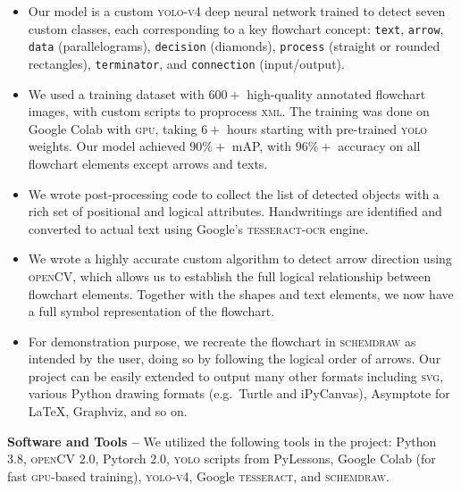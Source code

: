 \documentclass[10pt]{article}
\begin{document}
\begin{itemize}

\item Our model is a custom \textsc{yolo-v4} deep neural network
trained to detect seven custom classes, each corresponding to
a key flowchart concept: \texttt{text}, \texttt{arrow},
\texttt{data} (parallelograms), \texttt{decision} (diamonds), \texttt{process} (straight
or rounded rectangles), \texttt{terminator}, and \texttt{connection} (input/output).

\item We used a training dataset with $600+$ high-quality annotated flowchart
images, with custom scripts to proprocess \textsc{xml}.
The training was done on Google Colab with \textsc{gpu}, taking $6+$ hours
starting with pre-trained \textsc{yolo} weights.
Our model achieved $90\%+$ mAP, with $96\%+$ accuracy on
all flowchart elements except arrows and texts.

\item We wrote post-processing code to collect the list of detected objects with a
rich set of positional and logical attributes.
Handwritings are identified and converted to actual text using
Google's \textsc{tesseract-ocr} engine.

\item We wrote a highly accurate custom algorithm to detect arrow direction
using \textsc{openCV}, which allows us to establish the full logical relationship
between flowchart elements. Together with the shapes and text elements, we now
have a full symbol representation of the flowchart.

\item For demonstration purpose,
we recreate the flowchart in \textsc{schemdraw} as intended by
the user, doing so by following the logical order of arrows.
Our project can be easily extended to
output many other formats including \textsc{svg}, various Python drawing
formats (e.g.~Turtle and iPyCanvas), Asymptote for \LaTeX, Graphviz, and so on.

\end{itemize}

{\bf Software and Tools --}\phantom{i}
We utilized the following tools in the project: Python 3.8,
\textsc{openCV} 2.0, Pytorch 2.0, \textsc{yolo} scripts from PyLessons,
Google Colab (for fast \textsc{gpu}-based training),
\textsc{yolo-v4}, Google \textsc{tesseract}, and
\textsc{schemdraw}.

\end{document}

